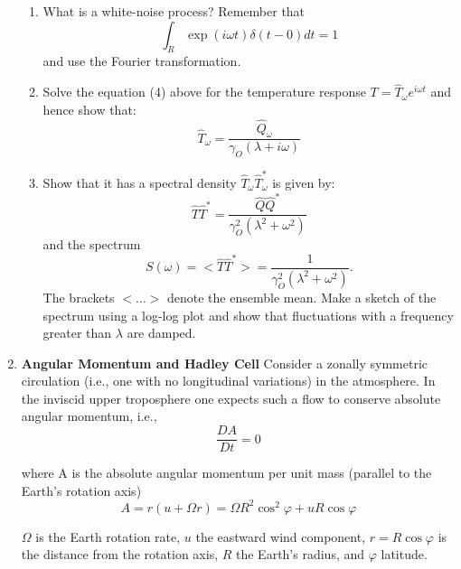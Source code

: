 \documentclass[a4paper,12pt]{article}
\begin{document}
\begin{enumerate}
\begin{enumerate}
\item  What is a white-noise process? Remember that 
\begin{equation}
\int_R \exp(i \omega t) \delta(t-0) dt = 1
\end{equation}
and use the Fourier transformation.

\item Solve the equation (4) above for the temperature response $T= \hat{T}_{\omega}
      e^{i\omega t}$ and hence show that:
 \begin{equation}
      \hat{T}_{\omega} = \frac{\hat{Q}_{\omega}}{\gamma_{O}\left({\lambda}+i \omega\right)}
\end{equation}

\item Show that it has a spectral density $\hat{T}_{\omega}\hat{T}^{*}_{\omega}$ is given by:
 \begin{equation}
      \hat{T}\hat{T}^{*}= \frac{\hat{Q}
      \hat{Q}^{*}}{\gamma^{2}_{O}\left({\lambda}^{2}+ \omega^{2}\right)}
\end{equation}
and the spectrum
\begin{equation}
 S(\omega)
      = <\hat{T}\hat{T}^{*}> =
      \frac{1}{\gamma^{2}_{O}\left({\lambda}^{2}+ \omega^{2}\right)}.
\end{equation}
The brackets $ < \dots >$ denote the ensemble mean.
Make a sketch of the spectrum using a log-log plot and show that fluctuations with a frequency greater than ${\lambda}$ are damped.
\end{enumerate}

\item {\bf Angular Momentum and Hadley Cell} Consider a
      zonally symmetric circulation (i.e., one with no longitudinal
      variations) in the atmosphere. In the inviscid upper troposphere
      one expects such a flow to conserve absolute angular momentum,
      i.e., 
\begin{equation}
\frac{DA}{Dt}=0
\end{equation}

where A is the absolute angular momentum per unit mass (parallel to
the Earth's rotation axis)
 \begin{equation}
 A = r
      \left(u + \Omega r \right) = \Omega R^{2} \cos^{2} \varphi + u R
      \cos \varphi
\end{equation}

 $\Omega$ is the Earth rotation rate, $u$ the eastward wind component,
 $ r = R \cos \varphi $ is the distance from the rotation axis, $R$
 the Earth's radius, and $\varphi$ latitude.


\end{enumerate}
\end{document}
